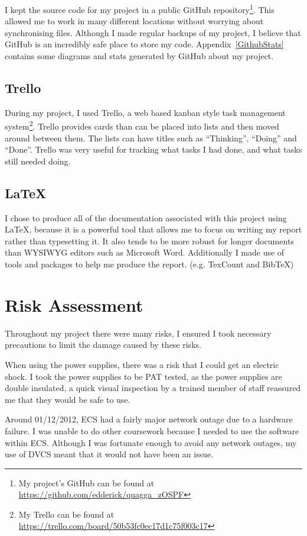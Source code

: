 \documentclass[12pt,a4paper,twoside]{report}
\begin{document}
I kept the source code for my project in a public GitHub repository\footnote{My
project's GitHub can be found at
\url{https://github.com/edderick/quagga\_zOSPF}}. This allowed me to work in
many different locations without worrying about synchronising files. Although
I made regular backups of my project, I believe that GitHub is an incredibly
safe place to store my code. Appendix~\ref{GithubStats} contains some
diagrams and stats generated by GitHub about my project. 

\subsection{Trello}
During my project, I used Trello, a web based kanban style task
management system\footnote{My Trello can be found at
\url{https://trello.com/board/50b53fc0ec17d1c75f003c17}}.
Trello provides cards than can be placed into lists and then moved around
between them. The lists can have titles such as ``Thinking'', ``Doing'' and
``Done''. Trello was very useful for tracking what tasks I had done, and what
tasks still needed doing. 

\subsection{\LaTeX}
I chose to produce all of the documentation associated with this project using
\LaTeX, because it is a powerful tool that allows me to focus on writing my
report rather than typesetting it. It also tends to be more robust for longer
documents than WYSIWYG editors such as Microsoft Word. Additionally I made use
of tools and packages to help me produce the report. (e.g. TexCount and BibTeX)

\section{Risk Assessment}
Throughout my project there were many risks, I ensured I took necessary
precautions to limit the damage caused by these risks.

When using the power supplies, there was a risk that I could get an electric
shock. I took the power supplies to be PAT tested, as the power supplies are
double insulated, a quick visual inspection by a trained member of staff
reassured me that they would be safe to use.

Around 01/12/2012, ECS had a fairly major network outage due to a hardware
failure. I was unable to do other coursework because I needed to use the
software within ECS\@. Although I was fortunate enough to avoid any network
outages, my use of DVCS meant that it would not have been an issue.
\end{document}
